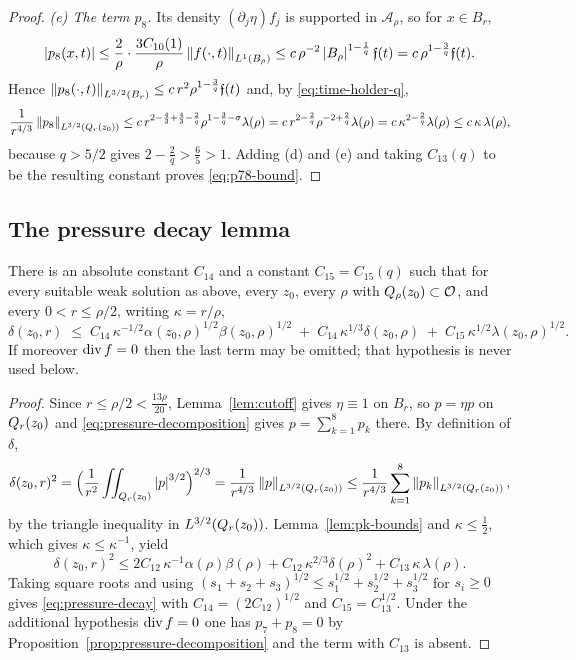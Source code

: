 \documentclass[11pt,reqno]{amsart}
\begin{document}
\begin{proof}
\emph{(e) The term $p_{8}$.} Its density $(\partial_{j}\eta)f_{j}$ is supported in
$\mathcal{A}_{\rho}$, so for $x\in B_{r}$,
\[
  \left\lvert p_{8}(x,t) \right\rvert\le\frac2\rho\cdot\frac{3C_{10}(1)}{\rho}
      \left\lVert f(\cdot,t) \right\rVert_{L^{1}(B_{\rho})}
  \le c\,\rho^{-2}\left\lvert B_{\rho} \right\rvert^{1-\frac1q}\mathfrak{f}(t)
  = c\,\rho^{1-\frac3q}\mathfrak{f}(t).
\]
Hence $\left\lVert p_{8}(\cdot,t) \right\rVert_{L^{3/2}(B_{r})}\le c\,r^{2}\rho^{1-\frac3q}\mathfrak{f}(t)$
and, by \eqref{eq:time-holder-q},
\[
  \frac{1}{r^{4/3}}\left\lVert p_{8} \right\rVert_{L^{3/2}(Q_{r}(z_{0}))}
  \le c\,r^{2-\frac43+\frac43-\frac2q}\rho^{1-\frac3q-\sigma}\lambda(\rho)
  = c\,r^{2-\frac2q}\rho^{-2+\frac2q}\lambda(\rho)
  = c\,\kappa^{2-\frac2q}\lambda(\rho)\le c\,\kappa\,\lambda(\rho),
\]
because $q>5/2$ gives $2-\tfrac2q>\tfrac65>1$. Adding (d) and (e) and taking
$C_{13}(q)$ to be the resulting constant proves \eqref{eq:p78-bound}.
\end{proof}

\subsection{The pressure decay lemma}\label{ss:pressure-decay}

\begin{theorem}\label{thm:pressure-decay}
There is an absolute constant $C_{14}$ and a constant $C_{15}=C_{15}(q)$ such
that for every suitable weak solution as above, every $z_{0}$, every $\rho$ with
$Q_{\rho}(z_{0})\subset\mathcal{O}$, and every $0<r\le\rho/2$, writing
$\kappa=r/\rho$,
\begin{equation}\label{eq:pressure-decay}
  \delta(z_{0},r)
  \;\le\;C_{14}\,\kappa^{-1/2}\alpha(z_{0},\rho)^{1/2}\beta(z_{0},\rho)^{1/2}
   \;+\;C_{14}\,\kappa^{1/3}\delta(z_{0},\rho)
   \;+\;C_{15}\,\kappa^{1/2}\lambda(z_{0},\rho)^{1/2} .
\end{equation}
If moreover $\operatorname{div} f=0$ then the last term may be omitted; that hypothesis is
never used below.
\end{theorem}

\begin{proof}
Since $r\le\rho/2<\tfrac{13\rho}{20}$, Lemma~\ref{lem:cutoff} gives $\eta\equiv1$
on $B_{r}$, so $p=\eta p$ on $Q_{r}(z_{0})$ and
\eqref{eq:pressure-decomposition} gives
$p=\sum_{k=1}^{8}p_{k}$ there. By definition of $\delta$,
\[
  \delta(z_{0},r)^{2}
  =\Bigl(\frac1{r^{2}}\iint_{Q_{r}(z_{0})}\left\lvert p \right\rvert^{3/2}\Bigr)^{2/3}
  =\frac{1}{r^{4/3}}\left\lVert p \right\rVert_{L^{3/2}(Q_{r}(z_{0}))}
  \le\frac{1}{r^{4/3}}\sum_{k=1}^{8}\left\lVert p_{k} \right\rVert_{L^{3/2}(Q_{r}(z_{0}))} ,
\]
by the triangle inequality in $L^{3/2}(Q_{r}(z_{0}))$. Lemma~\ref{lem:pk-bounds}
and $\kappa\le\tfrac12$, which gives $\kappa\le\kappa^{-1}$, yield
\[
  \delta(z_{0},r)^{2}
  \le 2C_{12}\,\kappa^{-1}\alpha(\rho)\beta(\rho)
    +C_{12}\,\kappa^{2/3}\delta(\rho)^{2}
    +C_{13}\,\kappa\,\lambda(\rho).
\]
Taking square roots and using
$(s_{1}+s_{2}+s_{3})^{1/2}\le s_{1}^{1/2}+s_{2}^{1/2}+s_{3}^{1/2}$ for
$s_{i}\ge0$ gives \eqref{eq:pressure-decay} with
$C_{14}=(2C_{12})^{1/2}$ and $C_{15}=C_{13}^{1/2}$. Under the additional
hypothesis $\operatorname{div} f=0$ one has $p_{7}+p_{8}=0$ by
Proposition~\ref{prop:pressure-decomposition} and the term with $C_{13}$ is
absent.
\end{proof}
\end{document}
